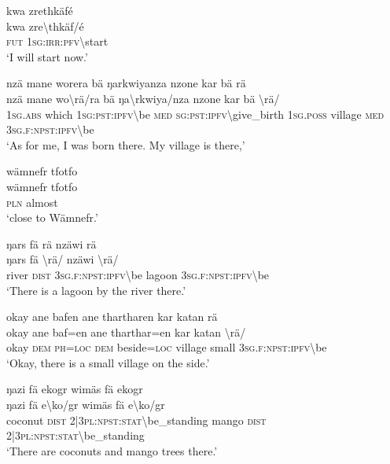 \ea\label{ex:14:a2910}
kwa zrethkäfé\\
\gll kwa	zre{\textbackslash}thkäf/é\\
     \textsc{fut}	1\textsc{sg}:\textsc{irr}:\textsc{pfv}{\textbackslash}start\\
\glt `I will start now.'
\z

\ea\label{ex:14:a2911}
nzä mane worera bä ŋarkwiyanza nzone kar bä rä\\
\gll nzä	mane	wo{\textbackslash}rä/ra	bä	ŋa{\textbackslash}rkwiya/nza	nzone	kar	bä	{\textbackslash}rä/\\
     1\textsc{sg}.\textsc{abs}	which	1\textsc{sg}:\textsc{pst}:\textsc{ipfv}{\textbackslash}be	\textsc{med}	\textsc{sg}:\textsc{pst}:\textsc{ipfv}{\textbackslash}give\_birth	1\textsc{sg}.\textsc{poss}	village	\textsc{med}	3\textsc{sg}.\textsc{f}:\textsc{npst}:\textsc{ipfv}{\textbackslash}be\\
\glt `As for me, I was born there. My village is there,'
\z

\ea\label{ex:14:a2913}
wämnefr tfotfo\\
\gll wämnefr	tfotfo\\
     \textsc{pln}	almost\\
\glt `close to Wämnefr.'
\z

\ea\label{ex:14:a2914}
ŋars fä rä nzäwi rä\\
\gll ŋars	fä	{\textbackslash}rä/	nzäwi	{\textbackslash}rä/\\
     river	\textsc{dist}	3\textsc{sg}.\textsc{f}:\textsc{npst}:\textsc{ipfv}{\textbackslash}be	lagoon	3\textsc{sg}.\textsc{f}:\textsc{npst}:\textsc{ipfv}{\textbackslash}be\\
\glt `There is a lagoon by the river there.'
\z

\ea\label{ex:14:a2916}
okay ane bafen ane thartharen kar katan rä\\
\gll okay	ane	baf=en	ane	tharthar=en	kar	katan	{\textbackslash}rä/\\
     okay	\textsc{dem}	\textsc{ph}=\textsc{loc}	\textsc{dem}	beside=\textsc{loc}	village	small	3\textsc{sg}.\textsc{f}:\textsc{npst}:\textsc{ipfv}{\textbackslash}be\\
\glt `Okay, there is a small village on the side.'
\z

\ea\label{ex:14:a2918}
ŋazi fä ekogr wimäs fä ekogr\\
\gll ŋazi	fä	e{\textbackslash}ko/gr	wimäs	fä	e{\textbackslash}ko/gr\\
     coconut	\textsc{dist}	2|3\textsc{pl}:\textsc{npst}:\textsc{stat}{\textbackslash}be\_standing	mango	\textsc{dist}	2|3\textsc{pl}:\textsc{npst}:\textsc{stat}{\textbackslash}be\_standing\\
\glt `There are coconuts and mango trees there.'
\z

